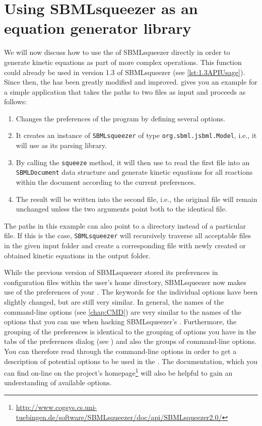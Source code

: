 \section{Using SBMLsqueezer as an equation generator library}
\label{sec:API}

We will now discuss how to use the \API of SBMLsqueezer directly in order to generate kinetic equations as part of more complex operations.
This function could already be used in version 1.3 of SBMLsqueezer (see \vref{lst:1.3APIUsage}).
Since then, the \API has been greatly modified and improved.
 gives you an example for a simple application that takes the paths to two \SBML files as input and proceeds as follows:
\begin{enumerate}
  \item Changes the preferences of the program by defining several options.
  \item It creates an instance of \texttt{SBMLsqueezer} of type \texttt{org.sbml.jsbml.Model}, i.e., it will use \JSBML as its parsing library.
  \item By calling the \texttt{squeeze} method, it will then use \JSBML to read the first file into an \texttt{SBMLDocument} data structure and generate kinetic equations for all reactions within the document according to the current preferences.
  \item The result will be written into the second file, i.e., the original file will remain unchanged unless the two arguments point both to the identical file.
\end{enumerate}
The paths in this example can also point to a directory instead of a particular file.
If this is the case, \texttt{SBMLsqueezer} will recursively traverse all acceptable \SBML files in the given input folder and create a corresponding file with newly created or obtained kinetic equations in the output folder.


While the previous version of SBMLsqueezer stored its preferences in configuration files within the user's home directory, SBMLsqueezer now makes use of the preferences of your \OS.
The keywords for the individual options have been slightly changed, but are still very similar.
In general, the names of the command-line options (see \vref{chap:CMD}) are very similar to the names of the options that you can use when hacking SBMLsqueezer's \API.
Furthermore, the grouping of the preferences is identical to the grouping of options you have in the tabs of the preferences dialog (see ) and also the groups of command-line options.
You can therefore read through the command-line options in order to get a description of potential options to be used in the \API.
The \Java \API documentation, which you can find on-line on the project's homepage\footnote{\url{http://www.cogsys.cs.uni-tuebingen.de/software/SBMLsqueezer/doc/api/SBMLsqueezer2.0/}} will also be helpful to gain an understanding of available options.


